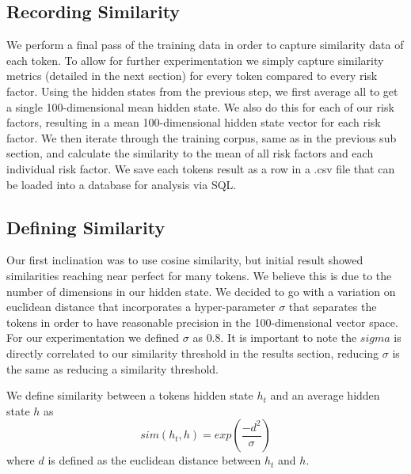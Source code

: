 \documentclass[11pt,a4paper]{article}
\begin{document}
\subsection{Recording Similarity}
We perform a final pass of the training data in order to capture similarity data of each token. To allow for further experimentation we simply capture similarity metrics (detailed in the next section) for every token compared to every risk factor. Using the hidden states from the previous step, we first average all to get a single 100-dimensional mean hidden state. We also do this for each of our risk factors, resulting in a mean 100-dimensional hidden state vector for each risk factor. We then iterate through the training corpus, same as in the previous sub section, and calculate the similarity to the mean of all risk factors and each individual risk factor. We save each tokens result as a row in a .csv file that can be loaded into a database for analysis via SQL.

\subsection{Defining Similarity}
Our first inclination was to use cosine similarity, but initial result showed similarities reaching near perfect for many tokens. We believe this is due to the number of dimensions in our hidden state. We decided to go with a variation on euclidean distance that incorporates a hyper-parameter $\sigma$ that separates the tokens in order to have reasonable precision in the 100-dimensional vector space. For our experimentation we defined $\sigma$ as $0.8$. It is important to note the ${sigma}$ is directly correlated to our similarity threshold in the results section, reducing ${\sigma}$ is the same as reducing a similarity threshold. 

We define similarity between a tokens hidden state $h_t$ and an average hidden state $h$ as $$ sim(h_t, h) = exp(\frac{-d^2}{\sigma})$$ where $d$ is defined as the euclidean distance between $h_t$ and $h$.
\end{document}
